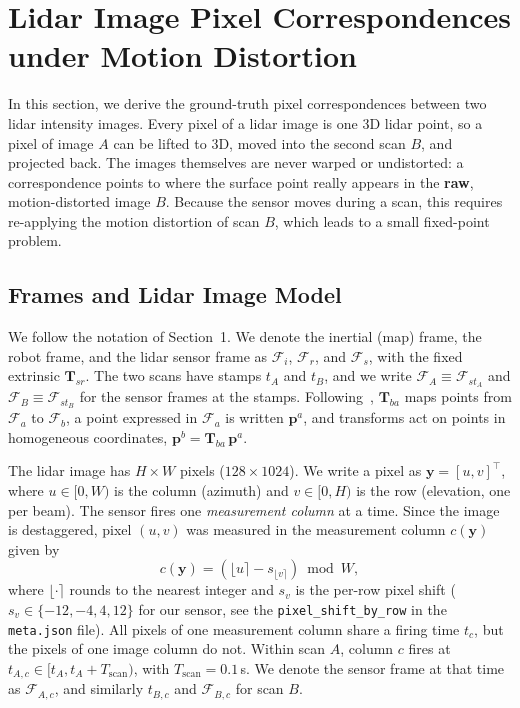 \newpage
\section{Lidar Image Pixel Correspondences under Motion Distortion}
\label{sec:pixel_match}
In this section, we derive the ground-truth pixel correspondences between two lidar intensity images. Every pixel of a lidar image is one 3D lidar point, so a pixel of image $A$ can be lifted to 3D, moved into the second scan $B$, and projected back. The images themselves are never warped or undistorted: a correspondence points to where the surface point really appears in the \textbf{raw}, motion-distorted image $B$. Because the sensor moves during a scan, this requires re-applying the motion distortion of scan $B$, which leads to a small fixed-point problem.

\subsection{Frames and Lidar Image Model}
\label{sec:image_model}
We follow the notation of Section~1. We denote the inertial (map) frame, the robot frame, and the lidar sensor frame as $\mathcal{F}_i$, $\mathcal{F}_r$, and $\mathcal{F}_s$, with the fixed extrinsic $\mathbf{T}_{sr}$. The two scans have stamps $t_A$ and $t_B$, and we write $\mathcal{F}_A \equiv \mathcal{F}_{st_A}$ and $\mathcal{F}_B \equiv \mathcal{F}_{st_B}$ for the sensor frames at the stamps. Following~\citet{barfoot2024state}, $\mathbf{T}_{ba}$ maps points from $\mathcal{F}_a$ to $\mathcal{F}_b$, a point expressed in $\mathcal{F}_a$ is written $\mathbf{p}^{a}$, and transforms act on points in homogeneous coordinates, $\mathbf{p}^{b} = \mathbf{T}_{ba}\,\mathbf{p}^{a}$.

The lidar image has $H \times W$ pixels ($128 \times 1024$). We write a pixel as $\mathbf{y} = [u, v]^{\top}$, where $u \in [0, W)$ is the column (azimuth) and $v \in [0, H)$ is the row (elevation, one per beam). The sensor fires one \emph{measurement column} at a time. Since the image is destaggered, pixel $(u, v)$ was measured in the measurement column $c(\mathbf{y})$ given by
\begin{equation}
    \label{eq:meas_col}
    c(\mathbf{y}) = \left(\lfloor u \rceil - s_{\lfloor v \rceil}\right) \bmod W,
\end{equation}
where $\lfloor\cdot\rceil$ rounds to the nearest integer and $s_v$ is the per-row pixel shift ($s_v \in \{-12, -4, 4, 12\}$ for our sensor, see the \texttt{pixel\_shift\_by\_row} in the \texttt{meta.json} file). All pixels of one measurement column share a firing time $t_{c}$, but the pixels of one image column do not. Within scan $A$, column $c$ fires at $t_{A,c} \in [t_A, t_A + T_{\mathrm{scan}})$, with $T_{\mathrm{scan}} = 0.1$\,s. We denote the sensor frame at that time as $\mathcal{F}_{A,c}$, and similarly $t_{B,c}$ and $\mathcal{F}_{B,c}$ for scan $B$.

